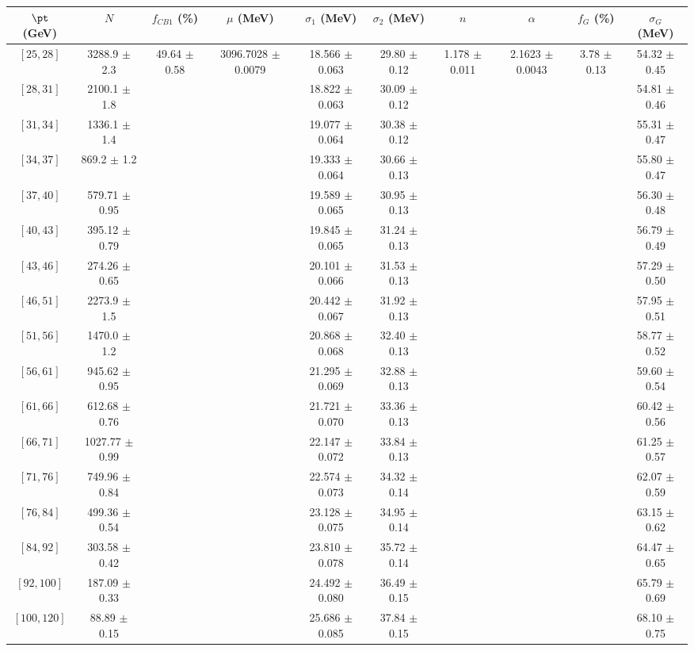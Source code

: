 \begin{tabular}{c||c|c|c|c|c|c|c|c|c}
$\pt$ (GeV) & $N$ & $f_{CB1}$ (\%)  & $\mu$ (MeV) & $\sigma_1$ (MeV) & $\sigma_2$ (MeV) & $n$ & $\alpha$ & $f_G$ (\%) & $\sigma_G$ (MeV) \\
\hline
$[25, 28]$ & 3288.9 $\pm$ 2.3 & \multirow{17}{*}{49.64 $\pm$ 0.58} & \multirow{17}{*}{3096.7028 $\pm$ 0.0079} & 18.566 $\pm$ 0.063 & 29.80 $\pm$ 0.12 & \multirow{17}{*}{1.178 $\pm$ 0.011} & \multirow{17}{*}{2.1623 $\pm$ 0.0043} & \multirow{17}{*}{3.78 $\pm$ 0.13} & 54.32 $\pm$ 0.45\\
$[28, 31]$ & 2100.1 $\pm$ 1.8 &  &  & 18.822 $\pm$ 0.063 & 30.09 $\pm$ 0.12 &  &  &  & 54.81 $\pm$ 0.46\\
$[31, 34]$ & 1336.1 $\pm$ 1.4 &  &  & 19.077 $\pm$ 0.064 & 30.38 $\pm$ 0.12 &  &  &  & 55.31 $\pm$ 0.47\\
$[34, 37]$ & 869.2 $\pm$ 1.2 &  &  & 19.333 $\pm$ 0.064 & 30.66 $\pm$ 0.13 &  &  &  & 55.80 $\pm$ 0.47\\
$[37, 40]$ & 579.71 $\pm$ 0.95 &  &  & 19.589 $\pm$ 0.065 & 30.95 $\pm$ 0.13 &  &  &  & 56.30 $\pm$ 0.48\\
$[40, 43]$ & 395.12 $\pm$ 0.79 &  &  & 19.845 $\pm$ 0.065 & 31.24 $\pm$ 0.13 &  &  &  & 56.79 $\pm$ 0.49\\
$[43, 46]$ & 274.26 $\pm$ 0.65 &  &  & 20.101 $\pm$ 0.066 & 31.53 $\pm$ 0.13 &  &  &  & 57.29 $\pm$ 0.50\\
$[46, 51]$ & 2273.9 $\pm$ 1.5 &  &  & 20.442 $\pm$ 0.067 & 31.92 $\pm$ 0.13 &  &  &  & 57.95 $\pm$ 0.51\\
$[51, 56]$ & 1470.0 $\pm$ 1.2 &  &  & 20.868 $\pm$ 0.068 & 32.40 $\pm$ 0.13 &  &  &  & 58.77 $\pm$ 0.52\\
$[56, 61]$ & 945.62 $\pm$ 0.95 &  &  & 21.295 $\pm$ 0.069 & 32.88 $\pm$ 0.13 &  &  &  & 59.60 $\pm$ 0.54\\
$[61, 66]$ & 612.68 $\pm$ 0.76 &  &  & 21.721 $\pm$ 0.070 & 33.36 $\pm$ 0.13 &  &  &  & 60.42 $\pm$ 0.56\\
$[66, 71]$ & 1027.77 $\pm$ 0.99 &  &  & 22.147 $\pm$ 0.072 & 33.84 $\pm$ 0.13 &  &  &  & 61.25 $\pm$ 0.57\\
$[71, 76]$ & 749.96 $\pm$ 0.84 &  &  & 22.574 $\pm$ 0.073 & 34.32 $\pm$ 0.14 &  &  &  & 62.07 $\pm$ 0.59\\
$[76, 84]$ & 499.36 $\pm$ 0.54 &  &  & 23.128 $\pm$ 0.075 & 34.95 $\pm$ 0.14 &  &  &  & 63.15 $\pm$ 0.62\\
$[84, 92]$ & 303.58 $\pm$ 0.42 &  &  & 23.810 $\pm$ 0.078 & 35.72 $\pm$ 0.14 &  &  &  & 64.47 $\pm$ 0.65\\
$[92, 100]$ & 187.09 $\pm$ 0.33 &  &  & 24.492 $\pm$ 0.080 & 36.49 $\pm$ 0.15 &  &  &  & 65.79 $\pm$ 0.69\\
$[100, 120]$ & 88.89 $\pm$ 0.15 &  &  & 25.686 $\pm$ 0.085 & 37.84 $\pm$ 0.15 &  &  &  & 68.10 $\pm$ 0.75\\
\end{tabular}
